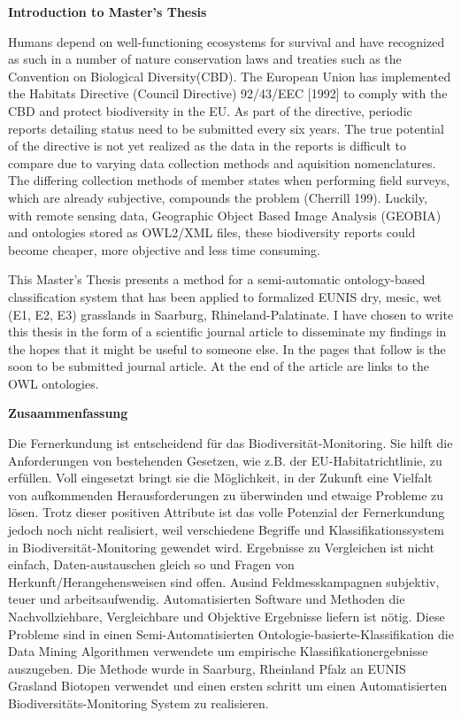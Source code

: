 \pagebreak
\begin{center}{\textbf{Introduction to Master's Thesis}}\end{center}
Humans depend on well-functioning ecosystems for survival and have
recognized as such in a number of nature conservation laws and treaties such
as the Convention on Biological Diversity(CBD). The European Union has
implemented the Habitats Directive (Council Directive) 92/43/EEC [1992] to
comply with the CBD and protect biodiversity in the EU. As part of the
directive, periodic reports detailing status need to be submitted every six
years. The true potential of the directive is not yet realized as the data
in the reports is difficult to compare due to varying data collection
methods and aquisition nomenclatures. The differing collection methods of
member states when performing field surveys, which are already subjective,
compounds the problem (Cherrill 199). Luckily, with remote sensing data,
Geographic Object Based Image Analysis (GEOBIA) and ontologies stored as
OWL2/XML files, these biodiversity reports could become cheaper, more
objective and less time consuming.

This Master's Thesis presents a method for a semi-automatic ontology-based
classification system that has been applied to formalized EUNIS dry, mesic,
wet (E1, E2, E3) grasslands in Saarburg, Rhineland-Palatinate. I have chosen
to write this thesis in the form of a scientific journal article to
disseminate my findings in the hopes that it might be useful to someone
else. In the pages that follow is the soon to be submitted journal article. At 
the end of the article are links to the OWL ontologies.

\begin{center}{\textbf{Zusaammenfassung}}\end{center}
Die Fernerkundung ist entscheidend f\"ur das Biodiversit\"at-Monitoring. Sie 
hilft die Anforderungen von bestehenden Gesetzen, wie z.B. der 
EU-Habitatrichtlinie, zu erf\"ullen. Voll eingesetzt bringt sie die 
M\"oglichkeit, in der Zukunft eine Vielfalt von aufkommenden Herausforderungen 
zu \"uberwinden und etwaige Probleme zu l\"osen. Trotz dieser 
positiven Attribute ist das volle Potenzial der Fernerkundung jedoch noch nicht 
realisiert, weil verschiedene Begriffe und Klassifikationssystem in 
Biodiversit\"at-Monitoring gewendet wird. Ergebnisse zu Vergleichen ist nicht 
einfach, Daten-austauschen gleich so und Fragen von Herkunft/Herangehensweisen 
sind offen. Au\sserdem sind Feldmesskampagnen subjektiv, teuer und 
arbeitsaufwendig. Automatisierten Software und Methoden die Nachvollziehbare, 
Vergleichbare und Objektive Ergebnisse liefern ist n\"otig. Diese Probleme sind 
in einen Semi-Automatisierten Ontologie-basierte-Klassifikation die Data 
Mining Algorithmen verwendete um empirische Klassifikationergebnisse auszugeben. 
Die Methode wurde in Saarburg, Rheinland Pfalz an EUNIS Grasland Biotopen 
verwendet und einen ersten schritt um einen Automatisierten 
Biodiversit\"ats-Monitoring System zu realisieren. 

